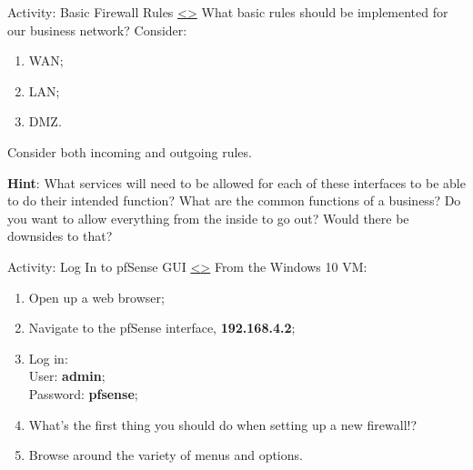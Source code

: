 \documentclass[12pt]{extarticle}
\newenvironment{instructionblock}{\Large\bgroup}{\egroup}
\begin{document}





\pagebreak
\begin{slide}{ Activity: Basic Firewall Rules }{ \hyperref[slide 9]{\textless}\hyperref[slide 11]{\textgreater} }
\vskip 5pt
\begin{instructionblock}
What basic rules should be implemented for our business network? Consider:
\begin{enumerate}
    \item WAN;
    \item LAN;
    \item DMZ.
\end{enumerate}
Consider both incoming and outgoing rules.
\end{instructionblock}
\end{slide}


\vspace{8mm}
\noindent
\textbf{Hint}: What services will need to be allowed for each of these interfaces to be able to do their intended function? What are the common functions of a business? Do you want to allow everything from the inside to go out? Would there be downsides to that?








\pagebreak
\begin{slide}{ Activity: Log In to pfSense GUI }{ \hyperref[slide 10]{\textless}\hyperref[slide 12]{\textgreater} }
\vskip 5pt
\begin{instructionblock}
From the Windows 10 VM:
\begin{enumerate}
    \item Open up a web browser;
    \item Navigate to the pfSense interface, \textbf{192.168.4.2};
    \item Log in:\\
    User: \textbf{admin};\\
    Password: \textbf{pfsense};
    \item What's the first thing you should do when setting up a new firewall!?
    \item Browse around the variety of menus and options.
\end{enumerate}
\end{instructionblock}
\end{slide}
\end{document}
